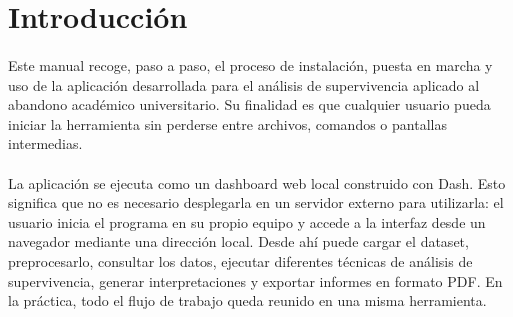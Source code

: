 % 

\makeatletter
\renewcommand*\l@section{\@dottedtocline{1}{1.5em}{4.0em}}
\renewcommand*\l@subsection{\@dottedtocline{2}{3.8em}{4.6em}}
\renewcommand*\l@subsubsection{\@dottedtocline{3}{7.0em}{5.2em}}
\makeatother


\section{Introducción}

\paragraph*{}Este manual recoge, paso a paso, el proceso de instalación, puesta en marcha y uso de la aplicación desarrollada para el análisis de supervivencia aplicado al abandono académico universitario. Su finalidad es que cualquier usuario pueda iniciar la herramienta sin perderse entre archivos, comandos o pantallas intermedias.

\paragraph*{}La aplicación se ejecuta como un dashboard web local construido con Dash. Esto significa que no es necesario desplegarla en un servidor externo para utilizarla: el usuario inicia el programa en su propio equipo y accede a la interfaz desde un navegador mediante una dirección local. Desde ahí puede cargar el dataset, preprocesarlo, consultar los datos, ejecutar diferentes técnicas de análisis de supervivencia, generar interpretaciones y exportar informes en formato PDF. En la práctica, todo el flujo de trabajo queda reunido en una misma herramienta.

